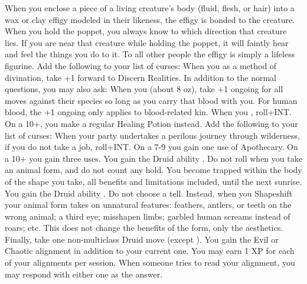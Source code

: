 \documentclass[darkmode]{dw_playbook}
\begin{document}
    {
            {When you enclose a piece of a living creature’s body (fluid, flesh, or hair) into a wax or clay effigy modeled in their likeness, the effigy is bonded to the creature.  When you hold the poppet, you always know to which direction that creature lies.  If you are near that creature while holding the poppet, it will faintly hear and feel the things you do to it.  To all other people the effigy is simply a lifeless figurine.}
        \gap
            {Add the following to your list of curses:
            \gapSm
            }
        \gap
            {When you  as a method of divination, take +1 forward to Discern Realities.  In addition to the normal questions, you may also ask:
            \gapSm
            }
        \gap
            {When you  (about 8 oz), take +1 ongoing for all moves against their species so long as you carry that blood with you.  For human blood, the +1 ongoing only applies to blood-related kin.}
        \gap
            {When you , roll+INT.  On a 10+, you make a regular Healing Potion instead.}
            {Add the following to your list of curses:
            \gapSm
            }
        \gap
            {When your party undertakes a perilous journey through wilderness, if you do not take a job, roll+INT.  On a 7-9 you gain one use of Apothecary.  On a 10+ you gain three uses.}
        \gap
            {You gain the Druid ability .  Do not roll when you take an animal form, and do not count any hold.  You become trapped within the body of the shape you take, all benefits and limitations included, until the next sunrise.
            \gap
            You gain the Druid ability .  Do not choose a tell.  Instead, when you Shapeshift your animal form takes on unnatural features: feathers, antlers, or teeth on the wrong animal; a third eye; misshapen limbs; garbled human screams instead of roars; etc.  This does not change the benefits of the form, only the aesthetics.
            \gap
            Finally, take one non-multiclass Druid move (except ).}
        \gap
            {You gain the Evil or Chaotic alignment in addition to your current one.  You may earn 1 XP for each of your alignments per session.  When someone tries to read your alignment, you may respond with either one as the answer.}
    }
\end{document}

